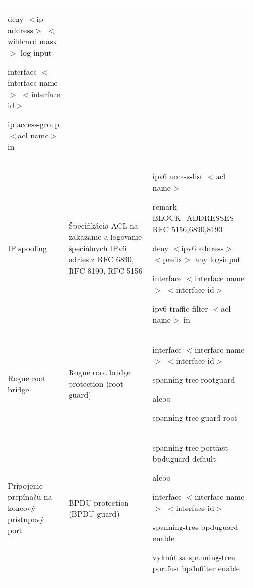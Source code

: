 \begin{longtable}[!htbp]{|L{10em}L{10em}>{\selectfont}L{34em}|}
	\hspace{0.5em}deny $<$ip address$>$ $<$wildcard mask$>$ log-input
	
	interface $<$interface name$>$ $<$interface id$>$
	
	\hspace{0.5em}ip access-group $<$acl name$>$ in\\
	
	
	
	
	 IP spoofing	&Špecifikácia ACL na zakázanie a logovanie špeciálnych IPv6 adries z RFC 6890, RFC 8190, RFC 5156	&
	ipv6 access-list $<$acl name$>$
	
	\hspace{0.5em}remark BLOCK\_ADDRESSES RFC 5156,6890,8190
	
	\hspace{0.5em}deny $<$ipv6 address$>$ $<$prefix$>$ any log-input
	
	interface $<$interface name$>$ $<$interface id$>$
	
	\hspace{0.5em}ipv6 traffic-filter $<$acl name$>$ in\\
	
	
	
	Rogue root bridge 	&Rogue root bridge protection (root guard)	&interface $<$interface name$>$ $<$interface id$>$
	
	\hspace{0.5em}spanning-tree rootguard
	
	\vspace{0.5em}
	{\selectfont alebo}
	\vspace{0.5em}
	
	\hspace{0.5em}spanning-tree guard root\\
	
	
	
	
	 Pripojenie prepínaču na koncový prístupový port	&BPDU protection (BPDU guard)	&spanning-tree portfast bpduguard default
	
	\vspace{0.5em}
	{\selectfont alebo}
	\vspace{0.5em}
	
	interface $<$interface name$>$ $<$interface id$>$
	
	\hspace{0.5em}spanning-tree bpduguard enable
	
	{\selectfont vyhnúť sa} spanning-tree portfast bpdufilter enable
	

\end{longtable}
